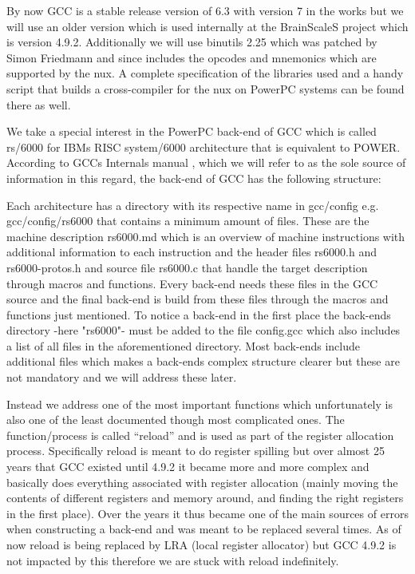 By now GCC is a stable release version of 6.3 with version 7 in the works but we will use an older version which is used internally at the BrainScaleS project which is version 4.9.2.
Additionally we will use binutils 2.25 which was patched by Simon Friedmann and since includes the opcodes and mnemonics which are supported by the nux.
A complete specification of the libraries used and a handy script that builds a cross-compiler for the nux on PowerPC systems can be found there as well.

We take a special interest in the PowerPC back-end of GCC which is called rs/6000 for IBMs RISC system/6000 architecture that is equivalent to POWER.
According to GCCs Internals manual , which we will refer to as the sole source of information in this regard, the back-end of GCC has the following structure:

Each architecture has a directory with its respective name in gcc/config e.g. gcc/config/rs6000 that contains a minimum amount of files.
These are the machine description rs6000.md which is an overview of machine instructions with additional information to each instruction and the header files rs6000.h and rs6000-protos.h and source file rs6000.c that handle the target description through macros and functions.
Every back-end needs these files in the GCC source and the final back-end is build from these files through the macros and functions just mentioned.
To notice a back-end in the first place the back-ends directory -here "rs6000"- must be added to the file config.gcc which also includes a list of all files in the aforementioned directory.
Most back-ends include additional files which makes a back-ends complex structure clearer but these are not mandatory and we will address these later.

Instead we address one of the most important functions which unfortunately is also one of the least documented though most complicated ones.
The function/process is called ``reload'' and is used as part of the register allocation process. 
Specifically reload is meant to do register spilling but over almost 25 years that GCC existed until 4.9.2 it became more and more complex and basically does everything associated with register allocation (mainly moving the contents of different registers and memory around, and finding the right registers in the first place).
Over the years it thus became one of the main sources of errors when constructing a back-end and was meant to be replaced several times.
As of now reload is being replaced by LRA (local register allocator) but GCC 4.9.2 is not impacted by this therefore we are stuck with reload indefinitely.

